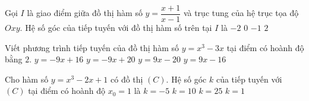 \begin{ex}%
	Gọi $I$ là giao điểm giữa đồ thị hàm số $y=\dfrac{x+1}{x-1}$ và trục tung của hệ trục tọa độ $Oxy$. Hệ số góc của tiếp tuyến với  đồ thị hàm số trên tại $I$ là
	 \choice
		{\True  $-2$}
		 {$0$}
		 {$-1$}
		 {$2$}
\end{ex}

\begin{ex}%
	Viết phương trình tiếp tuyến của đồ thị hàm số $y=x^3-3x$ tại điểm có hoành  độ bằng $2$.
	 \choice
		 {$y=-9x+16$}
		 {$y=-9x+20$}
		{$y=9x-20$} 
		 {\True $y=9x-16$}
\end{ex}

\begin{ex}%
	Cho hàm số $y=x^3-2x+1$ có đồ thị $(C)$. Hệ số góc $k$ của tiếp tuyến với $(C)$ tại điểm  có hoành độ $x_0=1$ là
	 \choice
		 {$k=-5$}
		{$k=10$} 
		{$k=25$} 
		 {\True $k=1$}
\end{ex}

